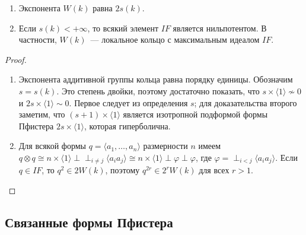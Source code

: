\documentclass[a4paper,oneside,12pt]{article}
\theoremstyle{plain} { \swapnumbers
\newtheorem{theorem}{Теорема}[subsection]
\newtheorem{corollary}[theorem]{Следствие}
\newtheorem{lemma}[theorem]{Лемма}
\newtheorem{proposition}[theorem]{Утверждение}
\newtheorem{claim}[theorem]{Факт}
}
\theoremstyle{definition} { \swapnumbers
\newtheorem{definition}[theorem]{Определение}
\newtheorem{notation}[theorem]{Обозначение}
\newtheorem{remark}[theorem]{Замечание}
\newtheorem{remarks}[theorem]{Замечания}
\newtheorem{example}[theorem]{Пример}
\newtheorem{examples}[theorem]{Примеры}
\newtheorem{sssection}[theorem]{}
}
\def\ph{\varphi}
\def\la{\langle}
\def\ra{\rangle}
\begin{document}
\begin{proposition}
\begin{enumerate}
\item Экспонента $W(k)$ равна $2s(k)$.
\item Если $s(k)<+\infty$, то всякий элемент $IF$ является нильпотентом. В частности, $W(k)$~--- локальное кольцо
с максимальным идеалом $IF$.
\end{enumerate}
\end{proposition}
\begin{proof}
\begin{enumerate}
\item
Экспонента аддитивной группы кольца равна порядку единицы. Обозначим $s=s(k)$. Это степень двойки, поэтому
достаточно показать, что $s\times\la 1\ra\not\sim 0$ и $2s\times\la 1\ra\sim 0$. Первое следует из определения $s$;
для доказательства второго заметим, что $(s+1)\times\la 1\ra$ является изотропной подформой формы
Пфистера $2s\times\la 1\ra$, которая гиперболична.
\item Для всякой формы $q=\la a_1,\dots,a_n\ra$ размерности $n$ имеем
$q\otimes q\cong n\times\la 1\ra\perp\perp_{i\neq j}\la a_ia_j\ra\cong n\times\la 1\ra\perp\ph\perp\ph$,
где $\ph=\perp_{i<j}\la a_ia_j\ra$. Если $q\in IF$, то $q^2\in 2W(k)$, поэтому
$q^{2r}\in 2^rW(k)$ для всех $r>1$.
\end{enumerate}
\end{proof}


\subsection{Связанные формы Пфистера}
\end{document}
